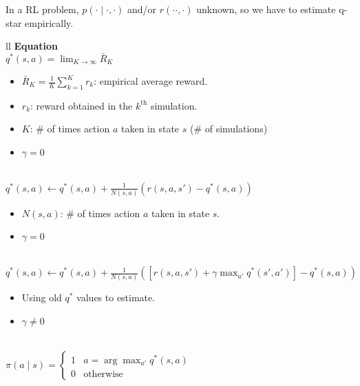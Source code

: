 \begin{summary} In a RL problem, $p(\cdot \mid \cdot, \cdot)$ and/or $r(\cdot \cdot, \cdot)$ unknown, so we have to estimate q-star empirically. 
    \begin{center}
        \begin{tabular}{ll}
            \toprule
            \textbf{Equation} \\
            \midrule
            $q^*(s,a) = \lim_{K \to \infty} \bar{R}_K$ \\
            {
            \begin{itemize}
                \item $\bar{R}_K = \frac{1}{K} \sum_{k=1}^{K} r_k$: empirical average reward. 
                \item $r_k$: reward obtained in the $k^\text{th}$ simulation.
                \item $K$: \# of times action $a$ taken in state $s$ (\# of simulations)
                \item $\gamma = 0$
            \end{itemize}
            } \\
            \midrule
            $q^*(s,a) \gets q^*(s,a) + \frac{1}{N(s,a)} \left( r(s,a,s') - q^*(s,a) \right)$ \\
            {
            \begin{itemize}
                \item $N(s,a)$: \# of times action $a$ taken in state $s$.
                \item $\gamma = 0$
            \end{itemize}
            } \\
            \midrule 
            $q^*(s,a) \gets q^*(s,a) + \frac{1}{N(s,a)} \left( \left[ r(s,a,s') + \gamma \max_{a'} q^*(s', a') \right] - q^*(s,a) \right)$ \\
            {
            \begin{itemize}
                \item Using old $q^*$ values to estimate. 
                \item $\gamma \neq 0$
            \end{itemize}
            } \\
            \midrule
            $\pi (a \mid s) = \begin{cases}
                1 & a = \arg \max_{a'} q^* (s,a) \\
                0 & \text{otherwise}
            \end{cases}$\\
            \bottomrule
        \end{tabular}
    \end{center}
\end{summary}

